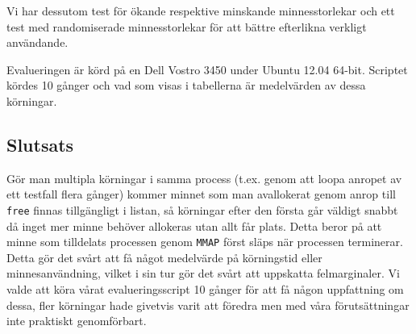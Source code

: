 \documentclass[a4paper]{article}
\begin{document}
Vi har dessutom test för ökande respektive minskande minnesstorlekar och ett test med randomiserade minnesstorlekar för att bättre efterlikna verkligt användande.

Evalueringen är körd på en Dell Vostro 3450 under Ubuntu 12.04 64-bit.
Scriptet kördes 10 gånger och vad som visas i tabellerna är medelvärden av dessa körningar.

\begin{table}[h]
\centering
\caption{Tidsåtgång för de olika implementationerna}
\end{table}

\begin{table}[h]
\centering
\caption{Minnesåtgång för de olika implementationerna}
\end{table}

\subsection*{Slutsats}
Gör man multipla körningar i samma process (t.ex. genom att loopa anropet av ett testfall flera gånger) kommer minnet som man avallokerat genom anrop till \texttt{free} finnas tillgängligt i listan, så körningar efter den första går väldigt snabbt då inget mer minne behöver allokeras utan allt får plats. Detta beror på att minne som tilldelats processen genom \texttt{MMAP} först släps när processen terminerar.
Detta gör det svårt att få något medelvärde på körningstid eller minnesanvändning, vilket i sin tur gör det svårt att uppskatta felmarginaler. Vi valde att köra vårat evalueringsscript 10 gånger för att få någon uppfattning om dessa, fler körningar hade givetvis varit att föredra men med våra förutsättningar inte praktiskt genomförbart.
\end{document}
